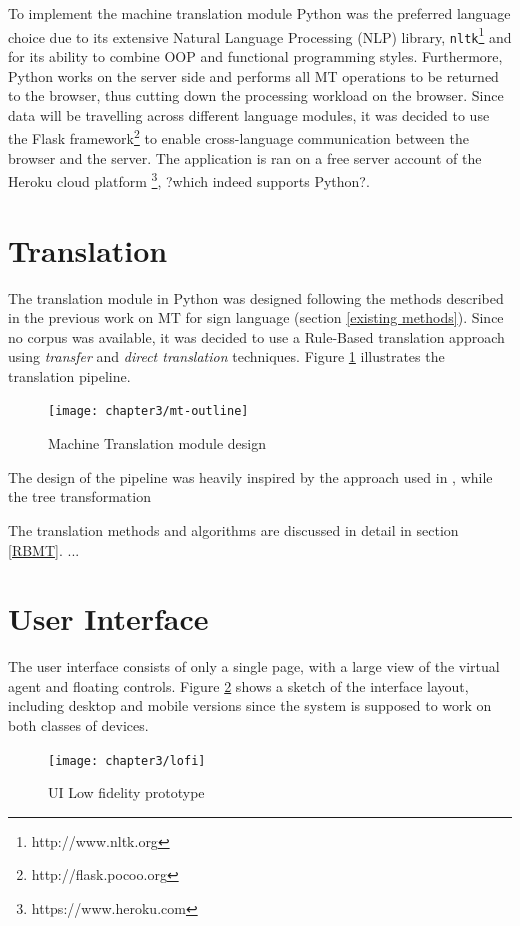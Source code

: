 \documentclass[12pt]{ociamthesis}  %
\begin{document}
To implement the machine translation module Python was the preferred language choice due to its extensive Natural Language Processing (NLP) library, \texttt{nltk}\footnote{http://www.nltk.org} and for its ability to combine OOP and functional programming styles. Furthermore, Python works on the server side and performs all MT operations to be returned to the browser, thus cutting down the processing workload on the browser. Since data will be travelling across different language modules, it was decided to use the Flask framework\footnote{http://flask.pocoo.org} to enable cross-language communication between the browser and the server. The application is ran on a free server account of the Heroku cloud platform \footnote{https://www.heroku.com}, ?which indeed supports Python?.

\section{Translation}
The translation module in Python was designed following the methods described in the previous work on MT for sign language (section \ref{existing methods}). Since no corpus was available, it was decided to use a Rule-Based translation approach using \textit{transfer} and \textit{direct translation} techniques. Figure \ref{fig:mt-outline} illustrates the translation pipeline. 
\begin{figure}[h]
	\centering
    \texttt{[image: chapter3/mt-outline]}
    \caption{Machine Translation module design}
    \label{fig:mt-outline}
\end{figure}

The design of the pipeline was heavily inspired by the approach used in , while the tree transformation 

The translation methods and algorithms are discussed in detail in section \ref{RBMT}. ...

\section{User Interface}
The user interface consists of only a single page, with a large view of the virtual agent and floating controls. Figure \ref{fig:lofi} shows a sketch of the interface layout, including desktop and mobile versions since the system is supposed to work on both classes of devices. 

\begin{figure}[h]
	\centering
    \texttt{[image: chapter3/lofi]}
    \caption{UI Low fidelity prototype}
    \label{fig:lofi}
\end{figure}
\end{document}
